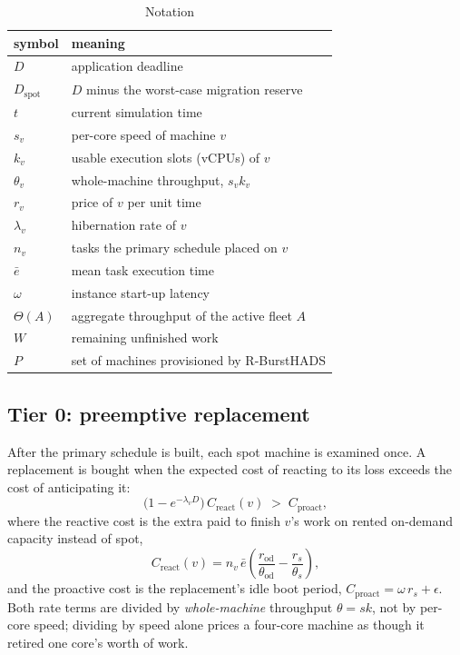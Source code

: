 \documentclass[conference]{IEEEtran}
\begin{document}
\begin{table}[!t]
\caption{Notation}
\label{tab:symbols}
\centering
\small
\begin{tabular}{@{}ll@{}}
\toprule
symbol & meaning \\
\midrule
$D$ & application deadline \\
$D_{\mathrm{spot}}$ & $D$ minus the worst-case migration reserve \\
$t$ & current simulation time \\
$s_v$ & per-core speed of machine $v$ \\
$k_v$ & usable execution slots (vCPUs) of $v$ \\
$\theta_v$ & whole-machine throughput, $s_v k_v$ \\
$r_v$ & price of $v$ per unit time \\
$\lambda_v$ & hibernation rate of $v$ \\
$n_v$ & tasks the primary schedule placed on $v$ \\
$\bar{e}$ & mean task execution time \\
$\omega$ & instance start-up latency \\
$\Theta(A)$ & aggregate throughput of the active fleet $A$ \\
$W$ & remaining unfinished work \\
$P$ & set of machines provisioned by R-BurstHADS \\
\bottomrule
\end{tabular}
\end{table}

\subsection{Tier 0: preemptive replacement}

After the primary schedule is built, each spot machine is examined once. A
replacement is bought when the expected cost of reacting to its loss exceeds the
cost of anticipating it:
\begin{equation}
\bigl(1 - e^{-\lambda_v D}\bigr)\, C_{\mathrm{react}}(v) \;>\; C_{\mathrm{proact}},
\label{eq:thm1}
\end{equation}
where the reactive cost is the extra paid to finish $v$'s work on rented
on-demand capacity instead of spot,
\begin{equation}
C_{\mathrm{react}}(v) = n_v\,\bar{e}\left(\frac{r_{\mathrm{od}}}{\theta_{\mathrm{od}}}
- \frac{r_{s}}{\theta_{s}}\right),
\label{eq:creact}
\end{equation}
and the proactive cost is the replacement's idle boot period,
$C_{\mathrm{proact}} = \omega\, r_{s} + \epsilon$. Both rate terms are divided by
\emph{whole-machine} throughput $\theta = s k$, not by per-core speed; dividing
by speed alone prices a four-core machine as though it retired one core's worth
of work.
\end{document}
